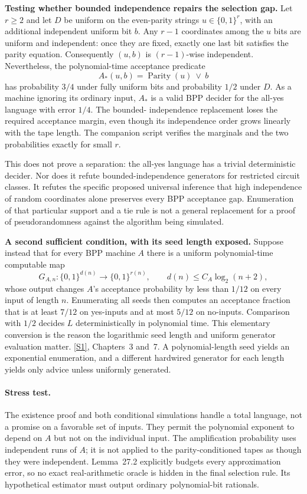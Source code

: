 \documentclass[11pt,a4paper]{article}
\newcommand{\sref}[2]{\hyperlink{source:#1:#2}{[S#2]}}
\numberwithin{equation}{section}
\begin{document}
\medskip
\textbf{Testing whether bounded independence repairs the selection gap.}
Let $r\ge2$ and let $D$ be uniform on the even-parity strings
$u\in\{0,1\}^r$, with an additional independent uniform bit $b$.
Any $r-1$ coordinates among the $u$ bits are uniform and independent:
once they are fixed, exactly one last bit satisfies the parity equation.
Consequently $(u,b)$ is $(r-1)$-wise independent. Nevertheless, the
polynomial-time acceptance predicate
\begin{equation}\label{r27:parity}
                 A_*(u,b)=\operatorname{Parity}(u)\ \lor\ b
\end{equation}
has probability $3/4$ under fully uniform bits and probability $1/2$
under $D$. As a machine ignoring its ordinary input, $A_*$ is a valid
BPP decider for the all-yes language with error $1/4$. The bounded-
independence replacement loses the required acceptance margin, even
though its independence order grows linearly with the tape length.
The companion script verifies the marginals and the two probabilities
exactly for small $r$.

This does not prove a separation: the all-yes language has a trivial
deterministic decider. Nor does it refute bounded-independence generators
for restricted circuit classes. It refutes the specific proposed
universal inference that high independence of random coordinates alone
preserves every BPP acceptance gap. Enumeration of that particular
support and a tie rule is not a general replacement for a proof of
pseudorandomness against the algorithm being simulated.

\medskip
\textbf{A second sufficient condition, with its seed length exposed.}
Suppose instead that for every BPP machine $A$ there is a uniform
polynomial-time computable map
\[
 G_{A,n}:\{0,1\}^{d(n)}\longrightarrow\{0,1\}^{r(n)},
             \qquad d(n)\le C_A\log_2(n+2),
\]
whose output changes $A$'s acceptance probability by less than $1/12$
on every input of length $n$. Enumerating all seeds then computes an
acceptance fraction that is at least $7/12$ on yes-inputs and at most
$5/12$ on no-inputs. Comparison with $1/2$ decides $L$ deterministically
in polynomial time. This elementary conversion is the reason the
logarithmic seed length and uniform generator evaluation matter.
\sref{statement}{1}, Chapters~3 and~7. A polynomial-length seed yields an
exponential enumeration, and a different hardwired generator for each
length yields only advice unless uniformly generated.

\paragraph{Stress test.}
The existence proof and both conditional simulations handle a total
language, not a promise on a favorable set of inputs. They permit the
polynomial exponent to depend on $A$ but not on the individual input.
The amplification probability uses independent runs of $A$; it is not
applied to the parity-conditioned tapes as though they were independent.
Lemma~27.2 explicitly budgets every approximation error, so no exact
real-arithmetic oracle is hidden in the final selection rule. Its
hypothetical estimator must output ordinary polynomial-bit rationals.
\end{document}
